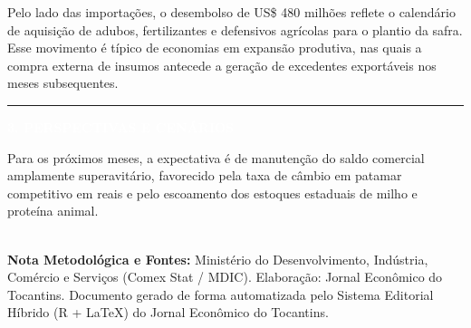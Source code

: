 \documentclass[10pt,a4paper]{article}
\newcommand{\secaojornal}[1]{%
  \vspace{6pt}%
  {\noindent\colorbox{azulto}{%
    \parbox{\dimexpr\textwidth-2\fboxsep\relax}{%
      \vspace{3pt}\hspace{4pt}\textcolor{douradoto}{\rule{7pt}{7pt}}\hspace{6pt}%
      \textcolor{white}{\textbf{\normalsize \MakeUppercase{#1}}}\vspace{3pt}%
    }%
  }}%
  \vspace{4pt}%
}
\begin{document}
Pelo lado das importações, o desembolso de US\$ 480 milhões reflete o calendário de aquisição de adubos, fertilizantes e defensivos agrícolas para o plantio da safra. Esse movimento é típico de economias em expansão produtiva, nas quais a compra externa de insumos antecede a geração de excedentes exportáveis nos meses subsequentes.

\secaojornal{3. Perspectivas e Cenários}

Para os próximos meses, a expectativa é de manutenção do saldo comercial amplamente superavitário, favorecido pela taxa de câmbio em patamar competitivo em reais e pelo escoamento dos estoques estaduais de milho e proteína animal.

\vfill
\noindent{\color{borda}\rule{\textwidth}{0.5pt}}\\[-2pt]
{\scriptsize\textcolor{cinzasuave}{\textbf{Nota Metodológica e Fontes:} Ministério do Desenvolvimento, Indústria, Comércio e Serviços (Comex Stat / MDIC). Elaboração: Jornal Econômico do Tocantins. Documento gerado de forma automatizada pelo Sistema Editorial Híbrido (R + LaTeX) do Jornal Econômico do Tocantins.}}
\end{document}
